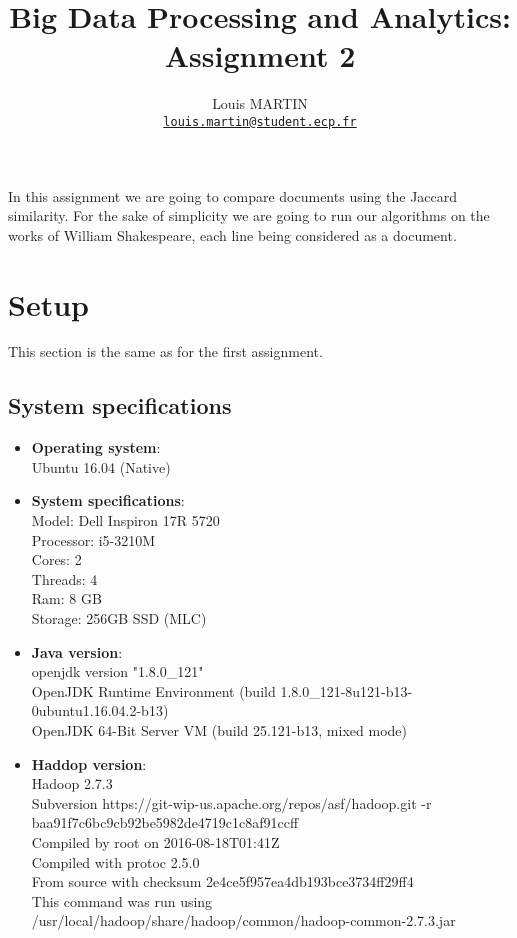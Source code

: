 \documentclass[a4paper,10pt]{article}
\title{Big Data Processing and Analytics: Assignment 2}
\author{Louis MARTIN\\
\href{mailto:louis.martin@student.ecp.fr}{\tt louis.martin@student.ecp.fr}}
\begin{document}
\maketitle

In this assignment we are going to compare documents using the Jaccard similarity.
For the sake of simplicity we are going to run our algorithms on the works of
William Shakespeare, each line being considered as a document.

\section{Setup}
This section is the same as for the first assignment.
\subsection{System specifications}

\begin{itemize}
    \item \textbf{Operating system}:\\
    Ubuntu 16.04 (Native)
    \item \textbf{System specifications}:\\
    Model: Dell Inspiron 17R 5720\\
    Processor: i5-3210M\\
    Cores: 2\\
    Threads: 4\\
    Ram: 8 GB\\
    Storage: 256GB SSD (MLC)
    \item \textbf{Java version}:\\
    openjdk version "1.8.0\_121"\\
    OpenJDK Runtime Environment (build 1.8.0\_121-8u121-b13-0ubuntu1.16.04.2-b13)\\
    OpenJDK 64-Bit Server VM (build 25.121-b13, mixed mode)
    \item \textbf{Haddop version}:\\
    Hadoop 2.7.3\\
    Subversion https://git-wip-us.apache.org/repos/asf/hadoop.git -r baa91f7c6bc9cb92be5982de4719c1c8af91ccff\\
    Compiled by root on 2016-08-18T01:41Z\\
    Compiled with protoc 2.5.0\\
    From source with checksum 2e4ce5f957ea4db193bce3734ff29ff4\\
    This command was run using /usr/local/hadoop/share/hadoop/common/hadoop-common-2.7.3.jar\\

\end{itemize}
\end{document}
